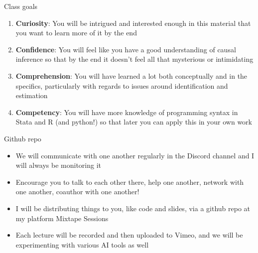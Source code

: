 \documentclass{beamer}
\begin{document}
\begin{frame}{Class goals}

  \begin{enumerate}
    \item \textbf{Curiosity}: You will be intrigued and interested enough in this material that you want to learn more of it by the end
    \item \textbf{Confidence}: You will feel like you have a good understanding of causal inference so that by the end it doesn't feel all that mysterious or intimidating
    \item \textbf{Comprehension}: You will have learned a lot both conceptually and in the specifics, particularly with regards to issues around identification and estimation
    \item \textbf{Competency}: You will have more knowledge of programming syntax in Stata and R (and python!) so that later you can apply this in your own work
  \end{enumerate}

\end{frame}







\begin{frame}{Github repo}

  \begin{itemize}
    \item We will communicate with one another regularly in the Discord channel and I will always be monitoring it
    \item Encourage you to talk to each other there, help one another, network with one another, coauthor with one another!
    \item I will be distributing things to you, like code and slides, via a github repo at my platform Mixtape Sessions
    \item Each lecture will be recorded and then uploaded to Vimeo, and we will be experimenting with various AI tools as well
  \end{itemize}

\end{frame}
\end{document}
